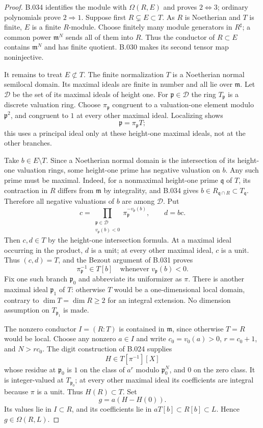 \begin{proof}
B.034 identifies the module with $\Omega(R,E)$ and proves
$2\Longleftrightarrow3$; ordinary polynomials prove
$2\Rightarrow1$. Suppose first $R\subsetneq E\subset T$.
As $R$ is Noetherian and $T$ is finite, $E$ is a finite
$R$-module. Choose finitely many module generators in $R^\sharp$;
a common power $\mathfrak m^N$ sends all of them into $R$.
Thus the conductor of $R\subset E$ contains $\mathfrak m^N$
and has finite quotient. B.030 makes its second tensor map
noninjective.

It remains to treat $E\not\subset T$. The finite normalization
$T$ is a Noetherian normal semilocal domain. Its maximal ideals
are finite in number and all lie over $\mathfrak m$.
Let $\mathcal D$ be the set of its maximal ideals of height one.
For $\mathfrak p\in\mathcal D$ the ring $T_{\mathfrak p}$ is a
discrete valuation ring. Choose $\pi_{\mathfrak p}$ congruent to
a valuation-one element modulo $\mathfrak p^2$, and congruent to
$1$ at every other maximal ideal. Localizing shows
\[
 \mathfrak p=\pi_{\mathfrak p}T;
\]
this uses a principal ideal only at these height-one maximal
ideals, not at the other branches.

Take $b\in E\setminus T$. Since a Noetherian normal domain is
the intersection of its height-one valuation rings, some
height-one prime has negative valuation on $b$. Any such prime
must be maximal. Indeed, for a nonmaximal height-one prime
$\mathfrak q$ of $T$, its contraction in $R$ differs from
$\mathfrak m$ by integrality, and B.034 gives
$b\in R_{\mathfrak q\cap R}\subset T_{\mathfrak q}$.
Therefore all negative valuations of $b$ are among
$\mathcal D$. Put
\[
 c=\prod_{\substack{\mathfrak p\in\mathcal D\\v_{\mathfrak p}(b)<0}}
          \pi_{\mathfrak p}^{-v_{\mathfrak p}(b)},\qquad d=bc.
\]
Then $c,d\in T$ by the height-one intersection formula.
At a maximal ideal occurring in the product, $d$ is a unit;
at every other maximal ideal, $c$ is a unit. Thus $(c,d)=T$,
and the Bezout argument of B.031 proves
\[
 \pi_{\mathfrak p}^{-1}\in T[b]
       \quad\text{whenever }v_{\mathfrak p}(b)<0.
\]
Fix one such branch $\mathfrak p_0$ and abbreviate its uniformizer
as $\pi$. There is another maximal ideal $\mathfrak p_1$ of
$T$: otherwise $T$ would be a one-dimensional local domain,
contrary to $\dim T=\dim R\ge2$ for an integral extension.
No dimension assumption on $T_{\mathfrak p_1}$ is made.

The nonzero conductor $I=(R:T)$ is contained in $\mathfrak m$,
since otherwise $T=R$ would be local. Choose any nonzero $a\in I$
and write $c_0=v_0(a)>0$, $r=c_0+1$, and $N>r c_0$.
The digit construction of B.024 supplies
\[
 H\in T[\pi^{-1}][X]
\]
whose residue at $\mathfrak p_0$ is $1$ on the class of $a^r$
modulo $\mathfrak p_0^N$, and $0$ on the zero class.
It is integer-valued at $T_{\mathfrak p_0}$; at every other
maximal ideal its coefficients are integral because $\pi$ is
a unit. Thus $H(R)\subset T$. Set
\[
 g=a(H-H(0)).
\]
Its values lie in $I\subset R$, and its coefficients lie in
$aT[b]\subset R[b]\subset L$. Hence $g\in\Omega(R,L)$.


\end{proof}
